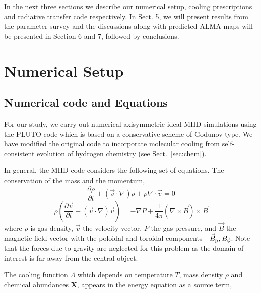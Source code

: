 \documentclass[useAMS,usenatbib,letters]{mn2e}
\begin{document}
In the next three sections we describe our numerical setup, cooling
prescriptions and radiative transfer code respectively. In
Sect. 5, we will present results from the parameter survey and the
discussions along with predicted ALMA maps will be presented in
Section 6 and 7, followed by conclusions.

\section{Numerical Setup}
\subsection{Numerical code and Equations}
For our study, we carry out numerical axisymmetric ideal MHD simulations using the PLUTO code \citep{Mignone:2007p644} which is based on a conservative scheme of Godunov type.
We have modified the original code to incorporate molecular cooling
from self-consistent evolution of hydrogen chemistry (see Sect.~\ref{sec:chem}).

  
In general, the MHD code considers the following set of equations.
The conservation of the mass and the momentum,
%
\begin{equation}\label{masscons}
\frac{\partial \rho}{\partial t} + (\vec{v} \cdot \nabla)\rho  +
\rho \nabla \cdot \vec{v} = 0
\end{equation}
%
\begin{equation}\label{momcons}
\rho(\frac{\partial \vec{v}}{\partial t} +
(\vec{v} \cdot \nabla) \vec{v}) =
- \nabla P + \frac{1}{4\pi} (\nabla \times \vec{B}) \times \vec{B}
\end{equation}
%
where $\rho$ is gas density, $\vec{v}$ the velocity vector, $P$ the gas pressure,
and $\vec{B}$ the magnetic field vector with the poloidal and toroidal
components - $\vec{B}_{\rm p}, {B}_{\phi}$. Note that the forces due
to gravity are neglected for this problem as the domain of interest is
far away from the central object.  
%

The cooling function $\Lambda$ which depends on temperature $T$, mass density $\rho$ and
chemical abundances {\bf{X}}, appears in the
energy equation as a source term,
\end{document}
